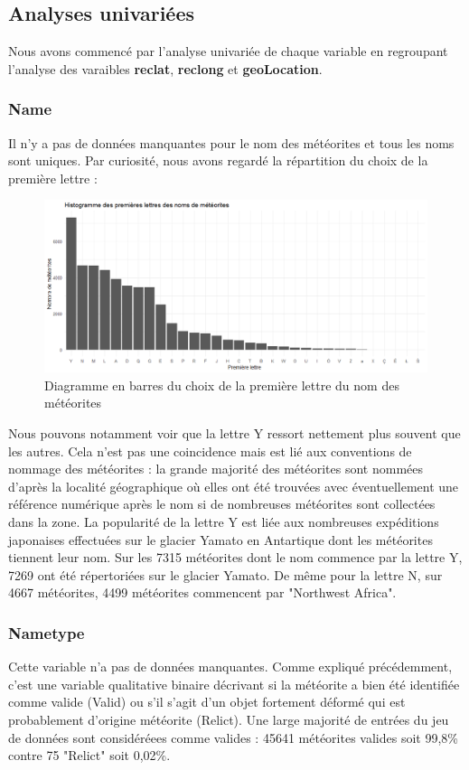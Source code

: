 \documentclass[12pt]{article}
\begin{document}
\subsection{Analyses univariées}
Nous avons commencé par l'analyse univariée de chaque variable en regroupant l'analyse des varaibles \textbf{reclat}, \textbf{reclong} et \textbf{geoLocation}. 
\\
\subsubsection*{Name}
Il n'y a pas de données manquantes pour le nom des météorites et tous les noms sont uniques. Par curiosité, nous avons regardé la répartition du choix de la première lettre :
\begin{figure}[H]
\centering
\includegraphics[width=16cm]{Images/exploration/name_barplot_lettres.png}
\caption{Diagramme en barres du choix de la première lettre du nom des météorites}
\end{figure}
Nous pouvons notamment voir que la lettre Y ressort nettement plus souvent que les autres. Cela n'est pas une coincidence mais est lié aux conventions de nommage des météorites \cite{Convention_nommage_meteorites} : la grande majorité des météorites sont nommées d'après la localité géographique où elles ont été trouvées avec éventuellement une référence numérique après le nom si de nombreuses météorites sont collectées dans la zone. La popularité de la lettre Y est liée aux nombreuses expéditions japonaises effectuées sur le glacier Yamato en Antartique dont les météorites tiennent leur nom. Sur les 7315 météorites dont le nom commence par la lettre Y, 7269 ont été répertoriées sur le glacier Yamato. De même pour la lettre N, sur 4667 météorites, 4499 météorites commencent par "Northwest Africa".
\subsubsection*{Nametype}
Cette variable n'a pas de données manquantes. Comme expliqué précédemment, c'est une variable qualitative binaire décrivant si la météorite a bien été identifiée comme valide (Valid) ou s'il s'agit d'un objet fortement déformé qui est probablement d'origine météorite (Relict). Une large majorité de entrées du jeu de données sont considéréees comme valides : 45641 météorites valides soit 99,8\% contre 75 "Relict" soit 0,02\%.
\end{document}
